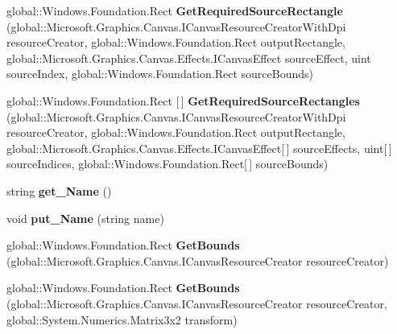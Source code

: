 \begin{DoxyCompactItemize}
global\+::\+Windows.\+Foundation.\+Rect {\bfseries Get\+Required\+Source\+Rectangle} (global\+::\+Microsoft.\+Graphics.\+Canvas.\+I\+Canvas\+Resource\+Creator\+With\+Dpi resource\+Creator, global\+::\+Windows.\+Foundation.\+Rect output\+Rectangle, global\+::\+Microsoft.\+Graphics.\+Canvas.\+Effects.\+I\+Canvas\+Effect source\+Effect, uint source\+Index, global\+::\+Windows.\+Foundation.\+Rect source\+Bounds)
\item 
\mbox{\label{class_microsoft_1_1_graphics_1_1_canvas_1_1_effects_1_1_shadow_effect_a6dff7512774551c4fea62a6d04e3c759}} 
global\+::\+Windows.\+Foundation.\+Rect \mbox{[}$\,$\mbox{]} {\bfseries Get\+Required\+Source\+Rectangles} (global\+::\+Microsoft.\+Graphics.\+Canvas.\+I\+Canvas\+Resource\+Creator\+With\+Dpi resource\+Creator, global\+::\+Windows.\+Foundation.\+Rect output\+Rectangle, global\+::\+Microsoft.\+Graphics.\+Canvas.\+Effects.\+I\+Canvas\+Effect\mbox{[}$\,$\mbox{]} source\+Effects, uint\mbox{[}$\,$\mbox{]} source\+Indices, global\+::\+Windows.\+Foundation.\+Rect\mbox{[}$\,$\mbox{]} source\+Bounds)
\item 
\mbox{\label{class_microsoft_1_1_graphics_1_1_canvas_1_1_effects_1_1_shadow_effect_ae75c5594a5505143330886ab97a00047}} 
string {\bfseries get\+\_\+\+Name} ()
\item 
\mbox{\label{class_microsoft_1_1_graphics_1_1_canvas_1_1_effects_1_1_shadow_effect_af2daadbe96b31c8535dd6d80f4fa8611}} 
void {\bfseries put\+\_\+\+Name} (string name)
\item 
\mbox{\label{class_microsoft_1_1_graphics_1_1_canvas_1_1_effects_1_1_shadow_effect_a74974b8df0482f01e4e4c8267d217afb}} 
global\+::\+Windows.\+Foundation.\+Rect {\bfseries Get\+Bounds} (global\+::\+Microsoft.\+Graphics.\+Canvas.\+I\+Canvas\+Resource\+Creator resource\+Creator)
\item 
\mbox{\label{class_microsoft_1_1_graphics_1_1_canvas_1_1_effects_1_1_shadow_effect_a9814bbd0429ff479d8ddd4998601c43d}} 
global\+::\+Windows.\+Foundation.\+Rect {\bfseries Get\+Bounds} (global\+::\+Microsoft.\+Graphics.\+Canvas.\+I\+Canvas\+Resource\+Creator resource\+Creator, global\+::\+System.\+Numerics.\+Matrix3x2 transform)

\end{DoxyCompactItemize}
